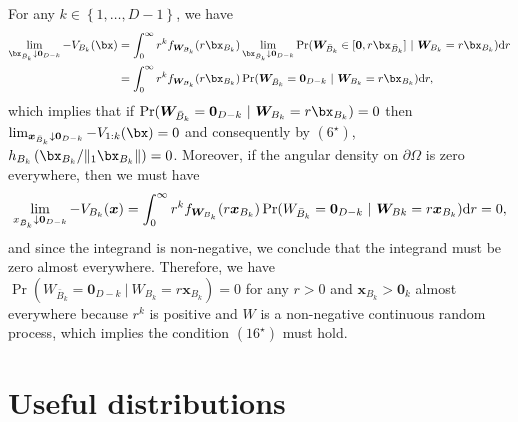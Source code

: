 \documentclass[12pt]{article}
\begin{document}
For any $k \in \left\{1, \ldots, D-1 \right\}$, we have
%
\begin{align*}
\lim_{\bx_{\bar{B}_k} \downarrow \bm 0_{D-k} } -V_{B_k}(\bx) 
&= \int_0^\infty r^k f_{\bm W_{B_k}}(r \bx_{B_k}) \lim_{\bx_{\bar{B}_k} \downarrow \bm 0_{D-k} }\Pr(\bm W_{\bar{B}_k} \in [\bm 0,r \bx_{\bar{B}_k} ]\ |\ \bm W_{B_k} = r \bx_{B_k} )\text dr\\
&= \int_0^\infty r^k f_{\bm W_{B_k}}(r \bx_{B_k})\Pr(\bm W_{\bar{B}_k}=\bm 0_{D-k}\ |\ \bm W_{B_k}=r \bx_{B_k} )\text dr,
\end{align*}
%
which implies that if $\Pr(\bm W_{\bar{B}_k}=\bm 0_{D-k}\ |\ \bm W_{B_k}=r \bx_{B_k}) = 0$ then $\lim_{\bm x_{\bar{B}_k} \downarrow \bm 0_{D-k} } -V_{1:k}(\bx) = 0$ 
and consequently by $(6^\star)$, $h_{B_k}\left(\bx_{B_k} / \|_1\bx_{B_k}\| \right)=0$.
%
Moreover, if the angular density on $\partial\Omega$ is zero everywhere, then we must have 
$$
\lim_{x_{\bar{B}_k}\downarrow \bm 0_{D-k} } -V_{B_k}(\bm x) 
= \int_0^\infty r^k f_{\bm W_{B_k}}(r \bm x_{B_k})\Pr(W_{\bar{B}_k} = \bm 0_{D-k}\ |\ \bm W_{Bk}=r \bm x_{B_k} )\text dr = 0,
$$
and since the integrand is non-negative, we conclude that the integrand must be zero almost everywhere. Therefore, we have $\Pr(W_{\bar{B}_k} = \bm 0_{D-k}\ |\ W_{B_k}=r\bm x_{B_k} )=0$ for any $r>0$ and $\bm x_{B_k} > \bm 0_k$ almost everywhere because $r^k$ is positive and $W$ is a non-negative continuous random process, which implies the condition $(16^\star)$ must hold.

\section{Useful distributions}
\end{document}
